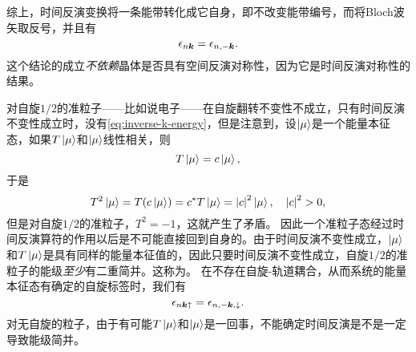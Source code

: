 综上，时间反演变换将一条能带转化成它自身，即不改变能带编号，而将Bloch波矢取反号，并且有
\begin{equation}
    \epsilon_{n \vb*{k}} = \epsilon_{n, -\vb*{k}}.
    \label{eq:inverse-k-energy}
\end{equation}
这个结论的成立\emph{不依赖}晶体是否具有空间反演对称性，因为它是时间反演对称性的结果。

对自旋$1/2$的准粒子——比如说电子——在自旋翻转不变性不成立，只有时间反演不变性成立时，没有\eqref{eq:inverse-k-energy}，但是注意到，设$\ket{\mu}$是一个能量本征态，如果$T \ket{\mu}$和$\ket{\mu}$线性相关，则
\[
    T \ket{\mu} = c \ket{\mu},
\]
于是
\[
    T^2 \ket{\mu} = T(c \ket{\mu}) = c^* T \ket{\mu} = \abs{c}^2 \ket{\mu}, \quad \abs{c}^2 > 0,
\]
但是对自旋$1/2$的准粒子，$T^2 = -1$，这就产生了矛盾。
因此一个准粒子态经过时间反演算符的作用以后是不可能直接回到自身的。由于时间反演不变性成立，$\ket{\mu}$和$T \ket{\mu}$是具有同样的能量本征值的，因此只要时间反演不变性成立，自旋$1/2$的准粒子的能级\emph{至少}有二重简并。这称为。
在不存在自旋-轨道耦合，从而系统的能量本征态有确定的自旋标签时，我们有
\begin{equation}
    \epsilon_{n \vb*{k} \uparrow} = \epsilon_{n, -\vb*{k}, \downarrow}.
\end{equation}
对无自旋的粒子，由于有可能$T \ket{\mu}$和$\ket{\mu}$是一回事，不能确定时间反演是不是一定导致能级简并。

